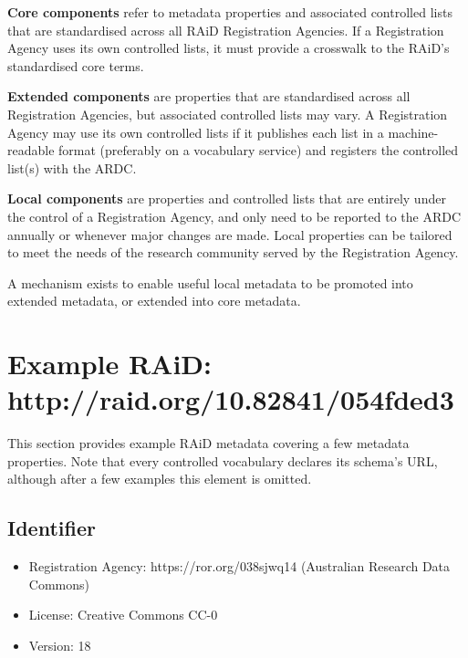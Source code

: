\documentclass[a0,portrait]{a0poster}
\begin{document}
\begin{multicols}{2}
{\textbf{Core components} refer to metadata properties and associated controlled lists that are standardised across all RAiD Registration Agencies. If a Registration Agency uses its own controlled lists, it must provide a crosswalk to the RAiD’s standardised core terms.

\textbf{Extended components} are properties that are standardised across all Registration Agencies, but associated controlled lists may vary. A Registration Agency may use its own controlled lists if it publishes each list in a machine-readable format (preferably on a vocabulary service) and registers the controlled list(s) with the ARDC. 

\textbf{Local components} are properties and controlled lists that are entirely under the control of a Registration Agency, and only need to be reported to the ARDC annually or whenever major changes are made. Local properties can be tailored to meet the needs of the research community served by the Registration Agency. 

A mechanism exists to enable useful local metadata to be promoted into extended metadata, or extended into core metadata.
}

\vfill


\color{ARDCBlue}
\section*{\LARGE Example RAiD: http://raid.org/10.82841/054fded3}
\color{DarkGrey}

This section provides example RAiD metadata covering a few metadata properties. Note that every controlled vocabulary declares its schema's URL, although after a few examples this element is omitted.
\begin{tiny}

\subsection*{Identifier}
\begin{itemize}
\item Registration Agency: https://ror.org/038sjwq14 (Australian Research Data Commons)
\item License: Creative Commons CC-0
\item Version: 18
\end{itemize}


\end{tiny}
\end{multicols}
\end{document}
